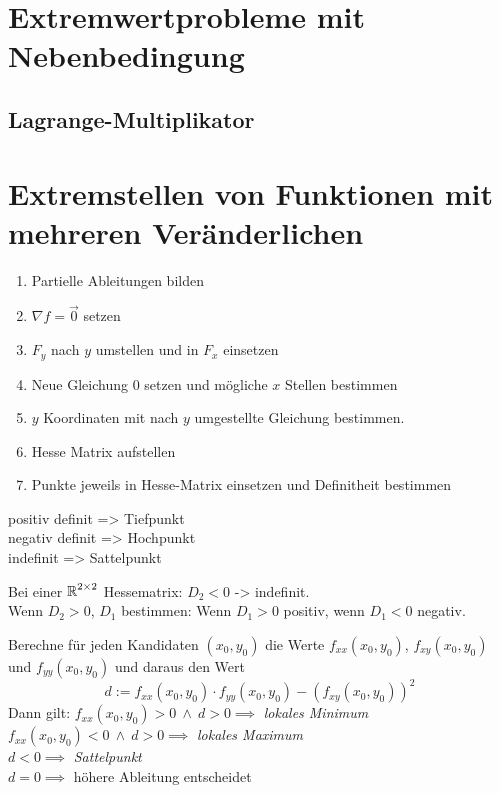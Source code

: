 \documentclass[main.tex]{subfiles}
\begin{document}
\renewcommand{\labelenumi}{\arabic{enumi}.}
\renewcommand*{\phi}{\varphi}

\section{Extremwertprobleme mit Nebenbedingung}
\subsection{Lagrange-Multiplikator}

\section{Extremstellen von Funktionen mit mehreren Veränderlichen}
\begin{enumerate}
    \item Partielle Ableitungen bilden
    \item $\nabla f = \vec{0}$ setzen
    \item $F_y$ nach $y$ umstellen und in $F_x$ einsetzen
    \item Neue Gleichung $0$ setzen und mögliche $x$ Stellen bestimmen
    \item $y$ Koordinaten mit nach $y$ umgestellte Gleichung bestimmen.
    \item Hesse Matrix aufstellen
    \item Punkte jeweils in Hesse-Matrix einsetzen und Definitheit bestimmen
\end{enumerate}

positiv definit => Tiefpunkt\\
negativ definit => Hochpunkt\\
indefinit => Sattelpunkt

Bei einer $\operatorname{\mathbb{R}}^{2\times 2}$ Hessematrix:
$D_2 < 0$ -> indefinit. \\
Wenn $D_2 > 0$, $D_1$ bestimmen: Wenn $D_1 > 0$ positiv, wenn $D_1 < 0$ negativ.

\vspace{1cm}

Berechne für jeden Kandidaten $(x_0, y_0)$ die Werte $f_{xx}(x_0, y_0)$, $f_{xy}(x_0, y_0)$ und $f_{yy}(x_0, y_0)$ und daraus den Wert
$$
    d := f_{xx}(x_0, y_0) \cdot f_{yy}(x_0, y_0) - \left(f_{xy}(x_0, y_0)\right)^2
$$
Dann gilt:
$f_{xx}(x_0, y_0) > 0 \ \land \ d > 0 \implies$ \emph{lokales Minimum} \\
$f_{xx}(x_0, y_0) < 0 \ \land \ d > 0 \implies$ \emph{lokales Maximum} \\
$d < 0 \implies$ \emph{Sattelpunkt} \\
$d = 0 \implies$ höhere Ableitung entscheidet \\
\end{document}
